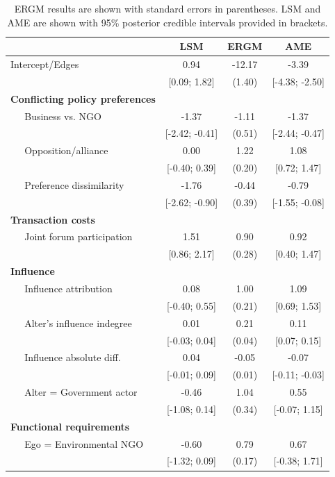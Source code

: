 \documentclass[12pt,pdflatex]{elsarticle}
\begin{document}
\begin{table}[ht]
\centering
\caption{ERGM results are shown with standard errors in parentheses. LSM and AME are shown with 95\% posterior credible intervals provided in brackets.}
\begin{tabular}{lccc}
  & LSM & ERGM & AME \\
  \hline
\hline
Intercept/Edges & 0.94 & -12.17 & -3.39 \\
   & [0.09; 1.82] & (1.40) & [-4.38; -2.50] \\
  \textbf{Conflicting policy preferences}  &  &  &  \\
  $\;\;\;\;$ Business vs. NGO & -1.37 & -1.11 & -1.37 \\
   & [-2.42; -0.41] & (0.51) & [-2.44; -0.47] \\
  $\;\;\;\;$ Opposition/alliance  & 0.00 & 1.22 & 1.08 \\
   & [-0.40; 0.39] & (0.20) & [0.72; 1.47] \\
  $\;\;\;\;$ Preference dissimilarity & -1.76 & -0.44 & -0.79 \\
   & [-2.62; -0.90] & (0.39) & [-1.55; -0.08] \\
  \textbf{Transaction costs}  &  &  &  \\
  $\;\;\;\;$ Joint forum participation & 1.51 & 0.90 & 0.92 \\
   & [0.86; 2.17] & (0.28) & [0.40; 1.47] \\
  \textbf{Influence}  &  &  &  \\
  $\;\;\;\;$ Influence attribution & 0.08 & 1.00 & 1.09 \\
   & [-0.40; 0.55] & (0.21) & [0.69; 1.53] \\
  $\;\;\;\;$ Alter's influence indegree & 0.01 & 0.21 & 0.11 \\
   & [-0.03; 0.04] & (0.04) & [0.07; 0.15] \\
  $\;\;\;\;$ Influence absolute diff. & 0.04 & -0.05 & -0.07 \\
   & [-0.01; 0.09] & (0.01) & [-0.11; -0.03] \\
  $\;\;\;\;$ Alter = Government actor & -0.46 & 1.04 & 0.55 \\
   & [-1.08; 0.14] & (0.34) & [-0.07; 1.15] \\
  \textbf{Functional requirements}  &  &  &  \\
  $\;\;\;\;$ Ego = Environmental NGO & -0.60 & 0.79 & 0.67 \\
  & [-1.32; 0.09] & (0.17) & [-0.38; 1.71] \\

\end{tabular}
\end{table}
\end{document}
